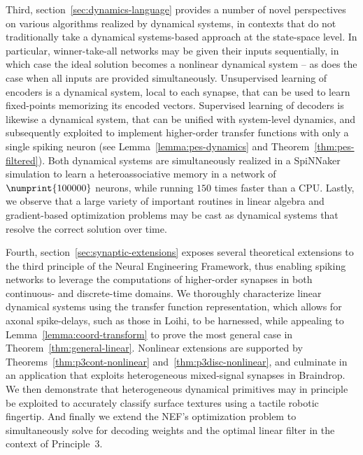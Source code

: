Third, section~\ref{sec:dynamics-language} provides a number of novel perspectives on various algorithms realized by dynamical systems, in contexts that do not traditionally take a dynamical systems-based approach at the state-space level.
In particular, winner-take-all networks may be given their inputs sequentially, in which case the ideal solution becomes a nonlinear dynamical system -- as does the case when all inputs are provided simultaneously.
Unsupervised learning of encoders is a dynamical system, local to each synapse, that can be used to learn fixed-points memorizing its encoded vectors. 
Supervised learning of decoders is likewise a dynamical system, that can be unified with system-level dynamics, and subsequently exploited to implement higher-order transfer functions with only a single spiking neuron (see Lemma~\ref{lemma:pes-dynamics} and Theorem~\ref{thm:pes-filtered}).
Both dynamical systems are simultaneously realized in a SpiNNaker simulation to learn a heteroassociative memory in a network of $\numprint{100000}$ neurons, while running $150$ times faster than a CPU.
Lastly, we observe that a large variety of important routines in linear algebra and gradient-based optimization problems may be cast as dynamical systems that resolve the correct solution over time.

Fourth, section~\ref{sec:synaptic-extensions} exposes several theoretical extensions to the third principle of the Neural Engineering Framework, thus enabling spiking networks to leverage the computations of higher-order synapses in both continuous- and discrete-time domains.
We thoroughly characterize linear dynamical systems using the transfer function representation, which allows for axonal spike-delays, such as those in Loihi, to be harnessed, while appealing to Lemma~\ref{lemma:coord-transform} to prove the most general case in Theorem~\ref{thm:general-linear}.
Nonlinear extensions are supported by Theorems~\ref{thm:p3cont-nonlinear} and~\ref{thm:p3disc-nonlinear}, and culminate in an application that exploits heterogeneous mixed-signal synapses in Braindrop.
We then demonstrate that heterogeneous dynamical primitives may in principle be exploited to accurately classify surface textures using a tactile robotic fingertip.
And finally we extend the NEF's optimization problem to simultaneously solve for decoding weights and the optimal linear filter in the context of Principle~3.

